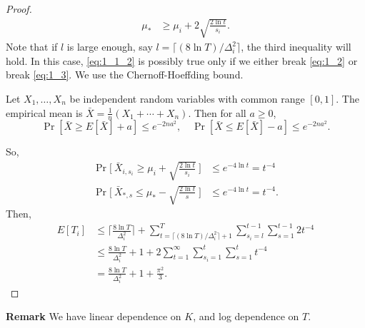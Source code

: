 \begin{proof}
\begin{align}
        \mu_* &\ge \mu_i + 2\sqrt{\frac{2\ln t}{s_i}}. \label{eq:1_3}
    \end{align}
    Note that if $l$ is large enough,
    say $l=\lceil (8\ln T)/\Delta_i^2\rceil$,
    the third inequality will hold.
    In this case,
    \eqref{eq:1_1_2} is possibly true only if we either break \eqref{eq:1_2} or break \eqref{eq:1_3}.
    We use the Chernoff-Hoeffding bound.
    \begin{framed}
        \begin{fact}
            Let $X_1, \dots, X_n$ be independent random variables with common range $[0,1]$.
            The empirical mean is $\bar X=\frac{1}{n}(X_1+\cdots+ X_n)$.
            Then for all $a\ge0$,
            \begin{equation}
                \Pr[\bar X\ge E[\bar X] + a] \le e^{-2na^2}, \quad
                \Pr[\bar X\le E[\bar X] - a] \le e^{-2na^2}.
            \end{equation}
        \end{fact}
    \end{framed}
    So,
    \begin{align}
        \Pr\Bigg[~\bar X_{i,s_i} \ge \mu_i + \sqrt{\frac{2\ln t}{s_i}}~\Bigg]
            &\le e^{-4\ln t} = t^{-4} \\
        \Pr\Bigg[~\bar X_{*,s} \le \mu_* - \sqrt{\frac{2\ln t}{s}}~\Bigg]
            &\le e^{-4\ln t} = t^{-4}.
    \end{align}
    Then,
    \begin{align}
        E[T_i]
            &\le \bigg\lceil \frac{8\ln T}{\Delta_i^2}\bigg\rceil +
            \sum_{t=\lceil (8\ln T)/\Delta_i^2\rceil+1}^T
            \sum_{s_i=l}^{t-1} \sum_{s=1}^{t-1}
            2t^{-4} \\
            &\le \frac{8\ln T}{\Delta_i^2} + 1 +
            2\sum_{t=1}^\infty \sum_{s_i=1}^{t} \sum_{s=1}^{t}t^{-4} \\
            &= \frac{8\ln T}{\Delta_i^2} + 1 + \frac{\pi^2}{3}.
    \end{align}
\end{proof}

\textbf{Remark}
We have linear dependence on $K$,
and log dependence on $T$.
